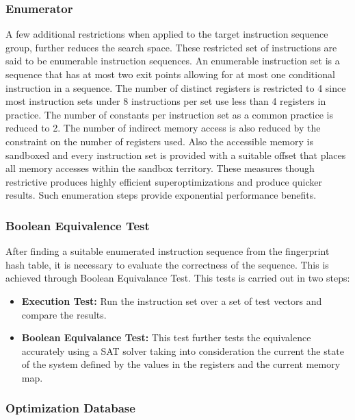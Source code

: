 \documentclass[sigconf]{acmart}
\begin{document}
\subsubsection{Enumerator}

A few additional restrictions when applied to the target instruction sequence group, further reduces the search space. These restricted set of instructions are said to be enumerable instruction sequences. An enumerable instruction set is a sequence that has at most two exit points allowing for at most one conditional instruction in a sequence.  The number of distinct registers is restricted to 4 since most instruction sets under 8 instructions per set use less than 4 registers in practice. The number of constants per instruction set as a common practice is reduced to 2. The number of indirect memory access is also reduced by the constraint on the number of registers used. Also the accessible memory is sandboxed and every instruction set is provided with a suitable offset that places all memory accesses within the sandbox territory. These measures though restrictive produces highly efficient superoptimizations and produce quicker results. Such enumeration steps provide exponential performance benefits. 


\subsubsection{Boolean Equivalence Test}

After finding a suitable enumerated instruction sequence from the fingerprint hash table, it is necessary to evaluate the correctness of the sequence. This is achieved through Boolean Equivalance Test. This tests is carried out in two steps: 

\begin{itemize}
\item{\textbf{Execution Test:}}
Run the instruction set over a set of test vectors and compare the results.
\item{\textbf{Boolean Equivalance Test:}}
This test further tests the equivalence accurately using a SAT solver taking into consideration the current the state of the system defined by the values in the registers and the current memory map.
\end{itemize}


\subsubsection{Optimization Database}
\end{document}
